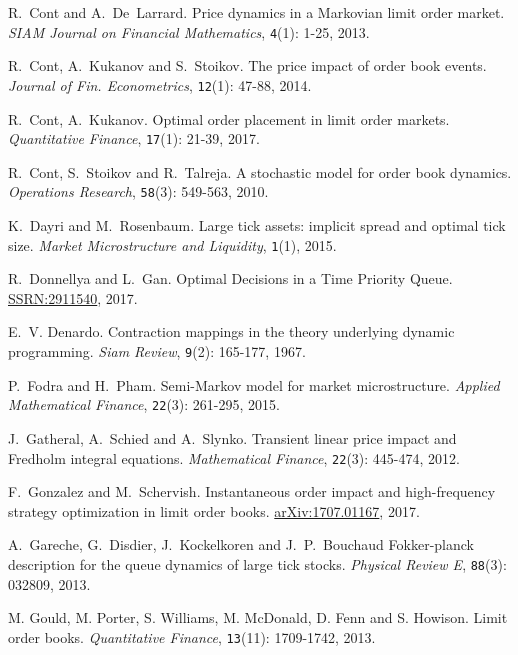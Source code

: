 \documentclass{amsart}[11pt]
\numberwithin{equation}{section}
\theoremstyle{definition}
\begin{document}
\begin{thebibliography}{10}
R.~Cont and A.~De~Larrard.
Price dynamics in a Markovian limit order market.
\textit{SIAM Journal on Financial Mathematics}, {\tt 4}(1): 1-25, 2013.

R.~Cont, A.~Kukanov and S.~Stoikov.
The price impact of order book events.
\textit{Journal of Fin. Econometrics}, {\tt 12}(1): 47-88, 2014.

R.~Cont, A.~Kukanov.
Optimal order placement in limit order markets.
\textit{Quantitative Finance}, {\tt 17}(1): 21-39, 2017.

R.~Cont, S.~Stoikov and R.~Talreja.
A stochastic model for order book dynamics.
\textit{Operations Research}, {\tt 58}(3): 549-563, 2010.

K.~Dayri and M.~Rosenbaum.
Large tick assets: implicit spread and optimal tick size.
\textit{Market Microstructure and Liquidity}, {\tt 1}(1), 2015.

R.~Donnellya and L.~Gan.
Optimal Decisions in a Time Priority Queue.
\href{https://papers.ssrn.com/sol3/papers.cfm?abstract_id=2911540}{SSRN:2911540}, 
2017.

E.~V. Denardo.
Contraction mappings in the theory underlying dynamic programming.
\textit{Siam Review}, {\tt 9}(2): 165-177, 1967.

P.~Fodra and H.~Pham.
Semi-Markov model for market microstructure.
\textit{Applied Mathematical Finance}, {\tt 22}(3): 261-295, 2015.

J.~Gatheral, A.~Schied and A.~Slynko.
Transient linear price impact and Fredholm integral equations.
\textit{Mathematical Finance}, {\tt 22}(3): 445-474, 2012.

F.~Gonzalez and M.~Schervish.
Instantaneous order impact and high-frequency strategy optimization in limit order books.
\href{https://arxiv.org/abs/1707.01167}{arXiv:1707.01167}, 
2017.

A.~Gareche, G.~Disdier, J.~Kockelkoren and J.~P.~Bouchaud
Fokker-planck description for the queue dynamics of large tick stocks.
\textit{Physical Review E}, {\tt 88}(3): 032809, 2013.

M. Gould, M. Porter, S. Williams, M. McDonald, D. Fenn and S. Howison.
Limit order books.
\textit{Quantitative Finance}, {\tt 13}(11): 1709-1742, 2013.


\end{thebibliography}
\end{document}
